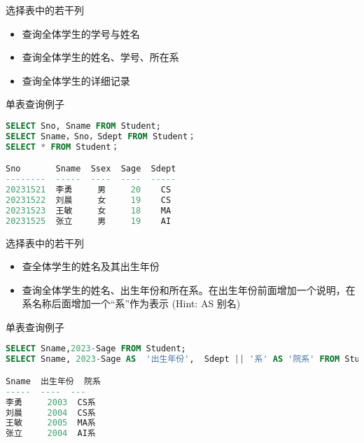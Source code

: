 \begin{frame}[fragile]{选择表中的若干列}
\begin{itemize}
    \item 查询全体学生的学号与姓名
    \item 查询全体学生的姓名、学号、所在系
    \item 查询全体学生的详细记录
\end{itemize}

\begin{block}{单表查询例子}
\begin{lstlisting}[language=SQL]
SELECT Sno, Sname FROM Student;
SELECT Sname，Sno，Sdept FROM Student；
SELECT * FROM Student； 

Sno       Sname  Ssex  Sage  Sdept
--------  -----  ----  ----  -----
20231521  李勇     男     20    CS
20231522  刘晨     女     19    CS
20231523  王敏     女     18    MA
20231525  张立     男     19    AI

\end{lstlisting}
\end{block}
\end{frame}




\begin{frame}[fragile]{选择表中的若干列}
\begin{itemize}
    \item 查全体学生的姓名及其出生年份
    \item 查询全体学生的姓名、出生年份和所在系。在出生年份前面增加一个说明，在系名称后面增加一个“系”作为表示 (Hint: AS 别名)
\end{itemize}

\begin{block}{单表查询例子}
\begin{lstlisting}[language=SQL]
SELECT Sname,2023-Sage FROM Student;
SELECT Sname, 2023-Sage AS  '出生年份',  Sdept || '系' AS '院系' FROM Student;

Sname  出生年份  院系
-----  ----  ---
李勇     2003  CS系
刘晨     2004  CS系
王敏     2005  MA系
张立     2004  AI系

\end{lstlisting}
\end{block}
\end{frame}


